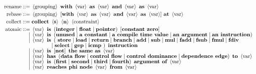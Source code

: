 \begin{minipage}{15cm}
\begin{align*}
\text{rename}      ::= {}&\left<\text{grouping}\right>\ \text{\bf with}\ \left<\text{var}\right>\ \text{\bf as}\ \left<\text{var}\right>\ { \text{\bf and}\ \left<\text{var}\right>\ \text{\bf as}\ \left<\text{var}\right> }\\[-1pt]
\text{rebase}      ::= {}&\left<\text{grouping}\right>\ [ \text{\bf with}\ \left<\text{var}\right>\ \text{\bf as}\ \left<\text{var}\right>\ { \text{\bf and}\ \left<\text{var}\right>\ \text{\bf as}\ \left<\text{var}\right> } ]\ \text{\bf at}\ \left<\text{var}\right>\\[-1pt]
\text{collect}     ::= {}&\text{\bf collect}\ \left<\text{\bf s}\right>\ \left<\text{\bf n}\right>\ \left<\text{constraint}\right>\\[-1pt]
\text{atomic} ::= {}&\left<\text{var}\right>\ \text{\bf is}\ \left(\text{\bf integer} \mid \text{\bf float} \mid \text{\bf pointer}\right)\ \left[\text{\bf constant zero}\right]\\[-5pt]
         \mid {}&\left<\text{var}\right>\ \text{\bf is}\ \left(\text{\bf unused} \mid \text{\bf a constant} \mid \text{\bf a compile time value} \mid \text{\bf an argument} \mid \text{\bf an instruction} \right)\\[-5pt]
         \mid {}&\left<\text{var}\right>\ \text{\bf is}\ \left(\ \text{\bf store} \mid \text{\bf load} \mid \text{\bf return} \mid \text{\bf branch} \mid \text{\bf add} \mid \text{\bf sub} \mid \text{\bf mul} \mid \text{\bf fadd} \mid \text{\bf fsub} \mid \text{\bf fmul} \mid \text{\bf fdiv} \right.\\[-5pt]
         &\hspace{3.4em}\left. \mid \text{\bf select} \mid \text{\bf gep} \mid \text{\bf icmp}\ \right)\ \text{\bf instruction}\\[-5pt]
         \mid {}&\left<\text{var}\right>\ \text{\bf is}\ \left[\text{\bf not}\right]\ \text{\bf the same as}\ \left<\text{var}\right>\\[-5pt]
         \mid {}&\left<\text{var}\right>\ \text{\bf has}\ \left(\text{\bf data flow} \mid \text{\bf control flow} \mid \text{\bf control dominance} \mid \text{\bf dependence edge} \right)\ \text{\bf to}\ \left<\text{var}\right>\\[-5pt]
         \mid {}&\left<\text{var}\right>\ \text{\bf is}\ \left(\text{\bf first} \mid \text{\bf second} \mid \text{\bf third} \mid \text{\bf fourth} \right)\ \text{\bf argument of}\ \left<\text{var}\right>\\[-5pt]
         \mid {}&\left<\text{var}\right>\ \text{\bf reaches phi node}\ \left<\text{var}\right>\ \text{\bf from}\ \left<\text{var}\right>\\[-5pt]

\end{align*}
\end{minipage}
